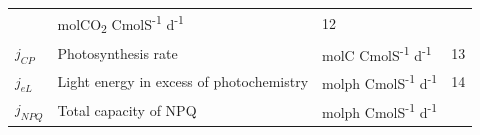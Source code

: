 \documentclass[]{elsarticle} %
\begin{document}
\begin{longtable}[c]{@{}llll@{}}
\begin{minipage}[t]{0.48\columnwidth}
\strut\end{minipage} &
\begin{minipage}[t]{0.26\columnwidth}\raggedright\strut
molCO\textsubscript{2} CmolS\textsuperscript{-1} d\textsuperscript{-1}
\strut\end{minipage} &
\begin{minipage}[t]{0.10\columnwidth}\raggedright\strut
12
\strut\end{minipage}\tabularnewline
\begin{minipage}[t]{0.12\columnwidth}\raggedright\strut
\(j_{CP}\)
\strut\end{minipage} &
\begin{minipage}[t]{0.48\columnwidth}\raggedright\strut
Photosynthesis rate
\strut\end{minipage} &
\begin{minipage}[t]{0.26\columnwidth}\raggedright\strut
molC CmolS\textsuperscript{-1} d\textsuperscript{-1}
\strut\end{minipage} &
\begin{minipage}[t]{0.10\columnwidth}\raggedright\strut
13
\strut\end{minipage}\tabularnewline
\begin{minipage}[t]{0.12\columnwidth}\raggedright\strut
\(j_{eL}\)
\strut\end{minipage} &
\begin{minipage}[t]{0.48\columnwidth}\raggedright\strut
Light energy in excess of photochemistry
\strut\end{minipage} &
\begin{minipage}[t]{0.26\columnwidth}\raggedright\strut
molph CmolS\textsuperscript{-1} d\textsuperscript{-1}
\strut\end{minipage} &
\begin{minipage}[t]{0.10\columnwidth}\raggedright\strut
14
\strut\end{minipage}\tabularnewline
\begin{minipage}[t]{0.12\columnwidth}\raggedright\strut
\(j_{NPQ}\)
\strut\end{minipage} &
\begin{minipage}[t]{0.48\columnwidth}\raggedright\strut
Total capacity of NPQ
\strut\end{minipage} &
\begin{minipage}[t]{0.26\columnwidth}\raggedright\strut
molph CmolS\textsuperscript{-1} d\textsuperscript{-1}
\strut\end{minipage} &
\begin{minipage}[t]{0.10\columnwidth}\raggedright\strut

\end{minipage}
\end{longtable}
\end{document}
